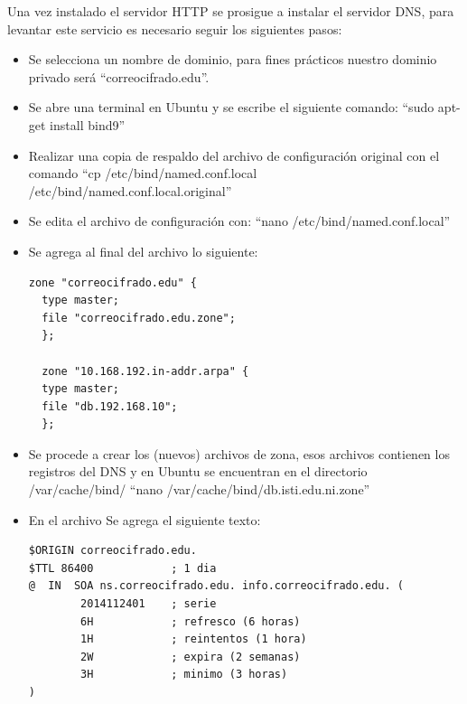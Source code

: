 Una vez instalado el servidor HTTP se prosigue a instalar el servidor DNS, para levantar este servicio es necesario seguir los siguientes pasos:
\begin{itemize}
 \item Se selecciona un nombre de dominio, para fines prácticos nuestro dominio privado será “correocifrado.edu”.
 \item Se abre una terminal en Ubuntu y se escribe el siguiente comando: “sudo apt-get install bind9”
 \item Realizar una copia de respaldo del archivo de configuración original con el comando “cp /etc/bind/named.conf.local \\ /etc/bind/named.conf.local.original”
 \item Se edita el archivo de configuración con: “nano /etc/bind/named.conf.local”
 \item Se agrega al final del archivo lo siguiente:
 \begin{lstlisting}[frame=single]
  zone "correocifrado.edu" {
  type master;
  file "correocifrado.edu.zone";
  };

  zone "10.168.192.in-addr.arpa" {
  type master;
  file "db.192.168.10";
  };
 \end{lstlisting}
 \item Se procede a crear los (nuevos) archivos de zona, esos archivos contienen los registros del DNS y en Ubuntu se encuentran en el directorio /var/cache/bind/ “nano /var/cache/bind/db.isti.edu.ni.zone”
 \item En el archivo Se agrega el siguiente texto:
 \begin{lstlisting}[frame=single]
  $ORIGIN correocifrado.edu.
$TTL 86400            ; 1 dia
@  IN  SOA ns.correocifrado.edu. info.correocifrado.edu. (
        2014112401    ; serie
        6H            ; refresco (6 horas)
        1H            ; reintentos (1 hora)
        2W            ; expira (2 semanas)
        3H            ; minimo (3 horas)
)


\end{lstlisting}
\end{itemize}
